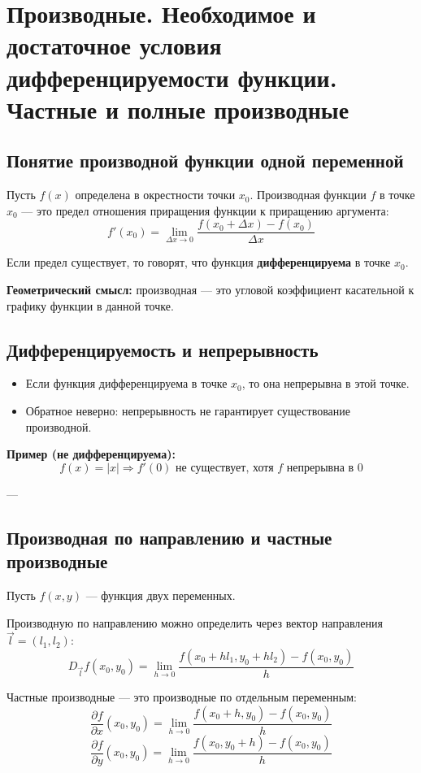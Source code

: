 \section{Производные. Необходимое и достаточное условия дифференцируемости функции. Частные и полные производные}

\subsection*{Понятие производной функции одной переменной}

Пусть $f(x)$ определена в окрестности точки $x_0$. Производная функции $f$ в точке $x_0$ — это предел отношения приращения функции к приращению аргумента:
\[
f'(x_0) = \lim_{\Delta x \to 0} \frac{f(x_0 + \Delta x) - f(x_0)}{\Delta x}
\]

Если предел существует, то говорят, что функция \textbf{дифференцируема} в точке $x_0$.

\textbf{Геометрический смысл:} производная — это угловой коэффициент касательной к графику функции в данной точке.

\subsection*{Дифференцируемость и непрерывность}

\begin{itemize}
  \item Если функция дифференцируема в точке $x_0$, то она непрерывна в этой точке.
  \item Обратное неверно: непрерывность не гарантирует существование производной.
\end{itemize}

\textbf{Пример (не дифференцируема):}
\[
f(x) = |x| \Rightarrow f'(0) \text{ не существует, хотя } f \text{ непрерывна в } 0
\]

---

\subsection*{Производная по направлению и частные производные}

Пусть $f(x, y)$ — функция двух переменных.

Производную по направлению можно определить через вектор направления $\vec{l} = (l_1, l_2)$:
\[
D_{\vec{l}} f(x_0, y_0) = \lim_{h \to 0} \frac{f(x_0 + h l_1, y_0 + h l_2) - f(x_0, y_0)}{h}
\]

Частные производные — это производные по отдельным переменным:
\[
\frac{\partial f}{\partial x}(x_0, y_0) = \lim_{h \to 0} \frac{f(x_0 + h, y_0) - f(x_0, y_0)}{h}
\]
\[
\frac{\partial f}{\partial y}(x_0, y_0) = \lim_{h \to 0} \frac{f(x_0, y_0 + h) - f(x_0, y_0)}{h}
\]

